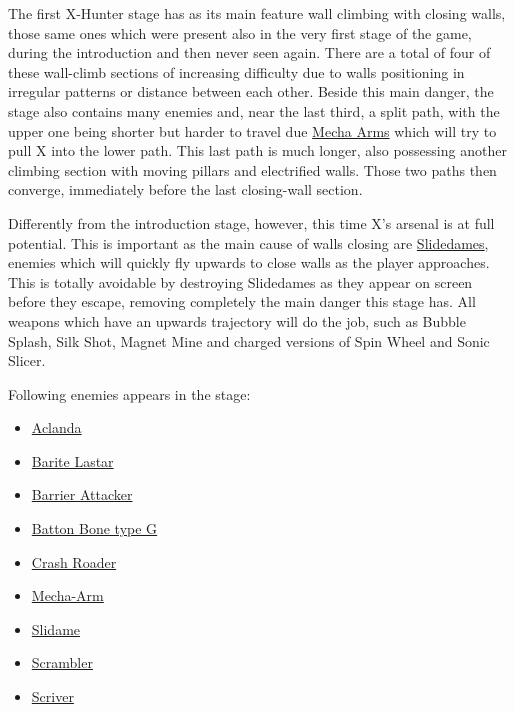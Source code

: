 The first X-Hunter stage has as its main feature wall climbing with closing walls, those same ones which were present also in the very first stage of the game, during the introduction and then never seen again. There are a total of four of these wall-climb sections of increasing difficulty due to walls positioning in irregular patterns or distance between each other. Beside this main danger, the stage also contains many enemies and, near the last third, a split path, with the upper one being shorter but harder to travel due \hyperlink{enem:Mecha-Arm}{Mecha Arms} which will try to pull X into the lower path. This last path is much longer, also possessing another climbing section with moving pillars and electrified walls. Those two paths then converge, immediately before the last closing-wall section.

Differently from the introduction stage, however, this time X's arsenal is at full potential. This is important as the main cause of walls closing are \hyperlink{enem:Slidame}{Slidedames}, enemies which will quickly fly upwards to close walls as the player approaches. This is totally avoidable by destroying Slidedames as they appear on screen before they escape, removing completely the main danger this stage has. All weapons which have an upwards trajectory will do the job, such as Bubble Splash, Silk Shot, Magnet Mine and charged versions of Spin Wheel and Sonic Slicer.

Following enemies appears in the stage:
\begin{itemize}
	\item \hyperlink{enem:Aclanda}{Aclanda}
	\item \hyperlink{enem:Barite_Lastar}{Barite Lastar}
	\item \hyperlink{enem:Barrier_Attacker}{Barrier Attacker}
	\item \hyperlink{enem:Batton_Bone_type_G}{Batton Bone type G}
	\item \hyperlink{enem:Crash_Roader}{Crash Roader}
	\item \hyperlink{enem:Mecha-Arm}{Mecha-Arm}
	\item \hyperlink{enem:Slidame}{Slidame}
	\item \hyperlink{enem:Scrambler}{Scrambler}
	\item \hyperlink{enem:Scriver}{Scriver}
\end{itemize}

